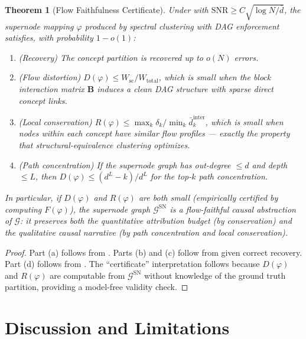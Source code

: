 \documentclass[11pt]{article}
\newtheorem{theorem}{Theorem}[section]
\newcommand{\cG}{\mathcal{G}}
\newcommand{\bB}{\mathbf{B}}
\newcommand{\1}{\mathbbm{1}}
\begin{document}
\begin{theorem}[Flow Faithfulness Certificate]
\label{thm:main}
  Under  with $\mathrm{SNR} \ge C \sqrt{\log N / \bar{d}}$, the supernode mapping $\varphi$ produced by spectral clustering with DAG enforcement satisfies, with probability $1 - o(1)$:
  \begin{enumerate}[label=(\alph*)]
    \item (Recovery) The concept partition is recovered up to $o(N)$ errors.
    \item (Flow distortion) $D(\varphi) \le W_{\mathrm{sc}} / W_{\mathrm{total}}$, which is small when the block interaction matrix $\bB$ induces a clean DAG structure with sparse direct concept links.
    \item (Local conservation) $R(\varphi) \le \max_k \delta_k / \min_k \bar{d}^{\mathrm{inter}}_k$, which is small when nodes within each concept have similar flow profiles — exactly the property that structural-equivalence clustering optimizes.
    \item (Path concentration) If the supernode graph has out-degree $\le d$ and depth $\le L$, then $D(\varphi) \le (d^L - k) / d^L$ for the top-$k$ path concentration.
  \end{enumerate}

  In particular, if $D(\varphi)$ and $R(\varphi)$ are both small (empirically certified by computing $F(\varphi)$), the supernode graph $\cG^{\mathrm{SN}}$ is a \emph{flow-faithful causal abstraction} of $\cG$: it preserves both the quantitative attribution budget (by conservation) and the qualitative causal narrative (by path concentration and local conservation).
\end{theorem}

\begin{proof}
  Part (a) follows from .
  Parts (b) and (c) follow from  given correct recovery.
  Part (d) follows from .
  The ``certificate'' interpretation follows because $D(\varphi)$ and $R(\varphi)$ are computable from $\cG^{\mathrm{SN}}$ without knowledge of the ground truth partition, providing a model-free validity check.
\end{proof}

\section{Discussion and Limitations}
\label{sec:discussion}
\end{document}
